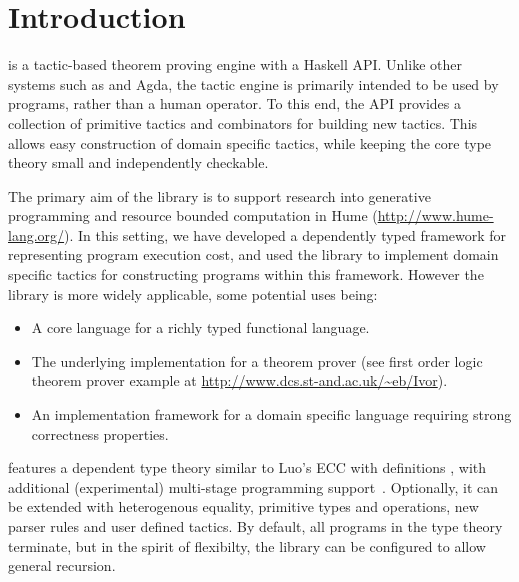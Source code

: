 \section{Introduction}

\Ivor{} is a tactic-based theorem proving engine with a Haskell
API. Unlike other systems such as \Coq{} \cite{coq-manual} and Agda,
the tactic engine is primarily intended to be used by programs, rather
than a human operator. To this end, the API provides a collection of
primitive tactics and combinators for building new tactics. This
allows easy construction of domain specific tactics, while keeping the
core type theory small and independently checkable.

The primary aim of the library is to support research into generative
programming and resource bounded computation in Hume
(\url{http://www.hume-lang.org/}). In this setting, we have developed a
dependently typed framework for representing program execution cost,
and used the \Ivor{} library to implement domain specific tactics for
constructing programs within this framework. However the library is
more widely applicable, some potential uses being:

\begin{itemize}
\item A core language for a richly typed functional language.
\item The underlying implementation for a theorem prover (see first order
  logic theorem prover example at 
  \url{http://www.dcs.st-and.ac.uk/~eb/Ivor}).
\item An implementation framework for a domain specific language requiring
  strong correctness properties.
\end{itemize}

\Ivor{} features a dependent type theory similar to Luo's ECC with
definitions \cite{luo94}, with additional (experimental) multi-stage
programming support~\cite{multi-taha}. Optionally, it can be extended
with heterogenous equality, primitive types and operations, new parser
rules and user defined tactics. By default, all programs in the type
theory terminate, but in the spirit of flexibilty, the library can be
configured to allow general recursion.

